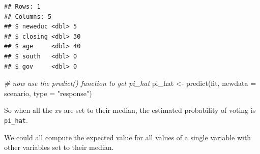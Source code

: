 \documentclass[
]{book}
\newenvironment{Shaded}{\begin{snugshade}}{\end{snugshade}}
\newcommand{\AttributeTok}[1]{\textcolor[rgb]{0.77,0.63,0.00}{#1}}
\newcommand{\CommentTok}[1]{\textcolor[rgb]{0.56,0.35,0.01}{\textit{#1}}}
\newcommand{\FunctionTok}[1]{\textcolor[rgb]{0.00,0.00,0.00}{#1}}
\newcommand{\NormalTok}[1]{#1}
\newcommand{\OtherTok}[1]{\textcolor[rgb]{0.56,0.35,0.01}{#1}}
\newcommand{\SpecialCharTok}[1]{\textcolor[rgb]{0.00,0.00,0.00}{#1}}
\newcommand{\StringTok}[1]{\textcolor[rgb]{0.31,0.60,0.02}{#1}}
\begin{document}
\begin{Shaded}
\end{Shaded}

\begin{verbatim}
## Rows: 1
## Columns: 5
## $ neweduc <dbl> 5
## $ closing <dbl> 30
## $ age     <dbl> 40
## $ south   <dbl> 0
## $ gov     <dbl> 0
\end{verbatim}

\begin{Shaded}
\begin{Highlighting}[]
\CommentTok{\# now use the predict() function to get pi\_hat}
\NormalTok{pi\_hat }\OtherTok{\textless{}{-}} \FunctionTok{predict}\NormalTok{(fit, }\AttributeTok{newdata =}\NormalTok{ scenario, }\AttributeTok{type =} \StringTok{"response"}\NormalTok{)}
\end{Highlighting}
\end{Shaded}

So when all the \(x\)s are set to their median, the estimated
probability of voting is \texttt{pi\_hat}.

We could all compute the expected value for all values of a single
variable with other variables set to their median.

\begin{Shaded}
\end{Shaded}
\end{document}
